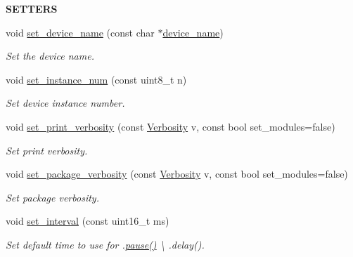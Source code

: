 \begin{Indent}{\bf S\+E\+T\+T\+E\+RS}\par
\begin{DoxyCompactItemize}
\item 
void \hyperlink{class_loom_manager_ab19b6f8d14ddbaf8cdada7e7d4d4a983}{set\+\_\+device\+\_\+name} (const char $\ast$\hyperlink{class_loom_manager_aac06e8c17477ab5d8991e782f9ffecca}{device\+\_\+name})
\begin{DoxyCompactList}\small\item\em Set the device name. \end{DoxyCompactList}\item 
void \hyperlink{class_loom_manager_ac8bd2ad89162850e9f7615856ba7cd48}{set\+\_\+instance\+\_\+num} (const uint8\+\_\+t n)
\begin{DoxyCompactList}\small\item\em Set device instance number. \end{DoxyCompactList}\item 
void \hyperlink{class_loom_manager_aa537a373b1aab6150915c1e27a691d7a}{set\+\_\+print\+\_\+verbosity} (const \hyperlink{_misc_8h_abf3be10d03894afb391f3a2935e3b313}{Verbosity} v, const bool set\+\_\+modules=false)
\begin{DoxyCompactList}\small\item\em Set print verbosity. \end{DoxyCompactList}\item 
void \hyperlink{class_loom_manager_aa9a1e310be9f6c806ac42421648724df}{set\+\_\+package\+\_\+verbosity} (const \hyperlink{_misc_8h_abf3be10d03894afb391f3a2935e3b313}{Verbosity} v, const bool set\+\_\+modules=false)
\begin{DoxyCompactList}\small\item\em Set package verbosity. \end{DoxyCompactList}\item 
void \hyperlink{class_loom_manager_aba4da59a1f3bf7422be299e6170b2d1c}{set\+\_\+interval} (const uint16\+\_\+t ms)
\begin{DoxyCompactList}\small\item\em Set default time to use for .\hyperlink{class_loom_manager_a3e57c97dd28717002cf11a1cff794239}{pause()} \textbackslash{} .delay(). \end{DoxyCompactList}\end{DoxyCompactItemize}
\end{Indent}
